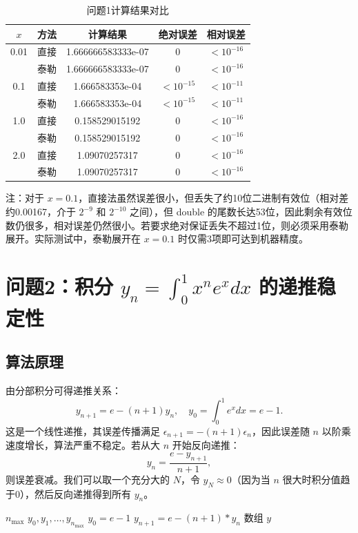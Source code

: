 \documentclass{article}
\begin{document}
\begin{table}[htbp]
\centering
\caption{问题1计算结果对比}
\label{tab:q1}
\begin{tabular}{|c|c|c|c|c|}
\hline
\(x\) & 方法 & 计算结果 & 绝对误差 & 相对误差 \\
\hline
0.01 & 直接 & 1.666666583333e-07 & 0 & \(<10^{-16}\) \\
     & 泰勒 & 1.666666583333e-07 & 0 & \(<10^{-16}\) \\
\hline
0.1  & 直接 & 1.666583353e-04 & \(<10^{-15}\) & \(<10^{-11}\) \\
     & 泰勒 & 1.666583353e-04 & \(<10^{-15}\) & \(<10^{-11}\) \\
\hline
1.0  & 直接 & 0.158529015192 & 0 & \(<10^{-16}\) \\
     & 泰勒 & 0.158529015192 & 0 & \(<10^{-16}\) \\
\hline
2.0  & 直接 & 1.09070257317 & 0 & \(<10^{-16}\) \\
     & 泰勒 & 1.09070257317 & 0 & \(<10^{-16}\) \\
\hline
\end{tabular}
\end{table}

注：对于 \(x=0.1\)，直接法虽然误差很小，但丢失了约10位二进制有效位（相对差约0.00167，介于 \(2^{-9}\) 和 \(2^{-10}\) 之间），但 double 的尾数长达53位，因此剩余有效位数仍很多，相对误差仍然很小。若要求绝对保证丢失不超过1位，则必须采用泰勒展开。实际测试中，泰勒展开在 \(x=0.1\) 时仅需3项即可达到机器精度。

\section{问题2：积分 \(y_n = \int_0^1 x^n e^x dx\) 的递推稳定性}

\subsection{算法原理}
由分部积分可得递推关系：
\[
y_{n+1} = e - (n+1) y_n, \quad y_0 = \int_0^1 e^x dx = e - 1.
\]
这是一个线性递推，其误差传播满足 \(\epsilon_{n+1} = -(n+1) \epsilon_n\)，因此误差随 \(n\) 以阶乘速度增长，算法严重不稳定。若从大 \(n\) 开始反向递推：
\[
y_n = \frac{e - y_{n+1}}{n+1},
\]
则误差衰减。我们可以取一个充分大的 \(N\)，令 \(y_N \approx 0\)（因为当 \(n\) 很大时积分值趋于0），然后反向递推得到所有 \(y_n\)。

\begin{algorithm}[H]
\caption{正向不稳定递推}
\begin{algorithmic}[1]
\REQUIRE \(n_{\max}\)
\ENSURE \(y_0, y_1, \dots, y_{n_{\max}}\)
\STATE \(y_0 = e - 1\)
    \STATE \(y_{n+1} = e - (n+1) * y_n\)
\ENDFOR
\RETURN 数组 \(y\)
\end{algorithmic}
\end{algorithm}
\end{document}
